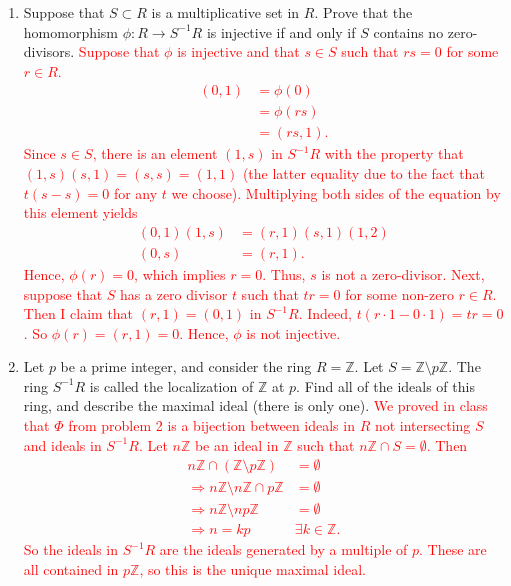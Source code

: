 \documentclass[12pt]{article}
\newcommand{\bbZ}{\mathbb{Z}}
\newcommand{\solution}[1]{\textcolor{red}{#1}}
\begin{document}
\begin{enumerate}
\item Suppose that $S\subset R$ is a multiplicative set in $R$. Prove
  that the homomorphism $\phi: R\rightarrow S^{-1}R$ is injective if
  and only if $S$ contains no zero-divisors. 
\solution{
Suppose that $\phi$ is injective and that $s \in S$ such that $rs=0$
for some $r\in R$.
\begin{align*}
 (0,1) &= \phi(0)\\ &= \phi(rs) \\ &= (rs,1).
\end{align*}
Since $s\in S$, there is an element $(1,s)$ in $S^{-1}R$ with the
property that $(1,s)(s,1)=(s,s)=(1,1)$ (the latter equality due to the
fact that $t(s-s)=0$ for any $t$ we choose). Multiplying both sides of
the equation by this element yields
\begin{align*}
  (0,1)(1,s) &= (r,1)(s,1)(1,2)\\
(0,s) &= (r,1). 
\end{align*}
Hence, $\phi(r)=0$, which implies $r=0$. Thus, $s$ is not a
zero-divisor.
Next, suppose that $S$ has a zero divisor $t$ such that $tr=0$ for
some non-zero $r\in R$. Then I claim that $(r,1)=(0,1)$ in
$S^{-1}R$. Indeed, $t(r\cdot 1 - 0 \cdot 1) = tr = 0$. So
$\phi(r)=(r,1)=0$. Hence, $\phi$ is not injective. 
}
\item Let $p$ be a prime integer, and consider the ring $R=\bbZ$. Let
  $S=\bbZ \setminus p\bbZ$. The ring $S^{-1}R$ is called the
  localization of $\bbZ$ at $p$. Find all of the ideals of this ring,
  and describe the maximal ideal (there is only one).
\solution{We proved in class that $\Phi$ from problem 2 is a bijection
  between ideals in $R$ not intersecting $S$ and ideals in
  $S^{-1}R$. Let $n\bbZ$ be an ideal in $\bbZ$ such that $n\bbZ \cap
  S=\emptyset$. Then
  \begin{align*}
    n\bbZ \cap (\bbZ\setminus p\bbZ) &= \emptyset \\
\Rightarrow n\bbZ \setminus n\bbZ \cap p\bbZ &= \emptyset\\
\Rightarrow n\bbZ \setminus np \bbZ &= \emptyset\\
\Rightarrow n=kp & \exists k\in \bbZ.
  \end{align*}
So the ideals in $S^{-1}R$ are the ideals generated by a multiple of
$p$. These are all contained in $p\bbZ$, so this is the unique maximal
ideal. }


\end{enumerate}
\end{document}
